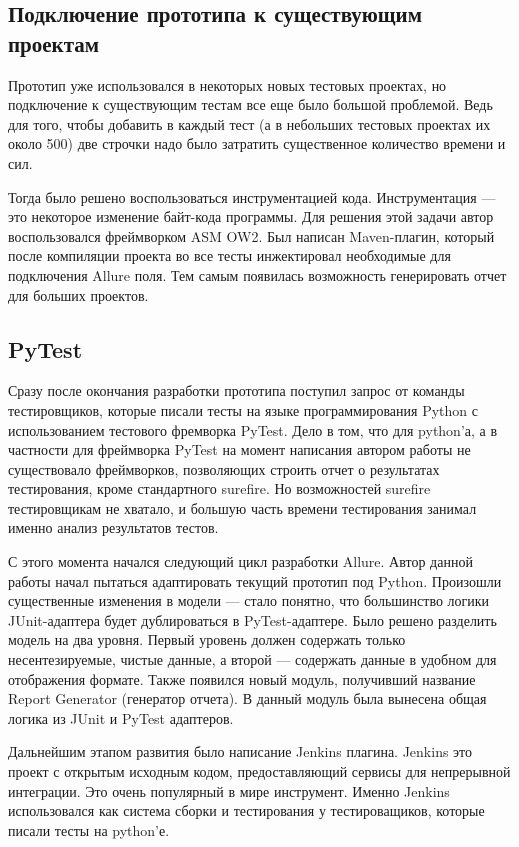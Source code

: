 \subsection{Подключение прототипа к существующим проектам}

Прототип уже использовался в некоторых новых тестовых проектах, но подключение к существующим тестам все еще было большой проблемой. Ведь для того, чтобы добавить в каждый тест (а в небольших тестовых проектах их около 500) две строчки надо было затратить существенное количество времени и сил. 

Тогда было решено воспользоваться инструментацией кода. Инструментация --- это некоторое изменение байт-кода программы. Для решения этой задачи автор воспользовался фреймворком ASM OW2. Был написан Maven-плагин, который после компиляции проекта во все тесты инжектировал необходимые для подключения Allure поля. Тем самым появилась возможность генерировать отчет для больших проектов.

\subsection{PyTest}

Сразу после окончания разработки прототипа поступил запрос от команды тестировщиков, которые писали тесты на языке программирования Python с использованием тестового фремворка PyTest. Дело в том, что для python'а, а в частности для фреймворка PyTest на момент написания автором работы не существовало фреймворков, позволяющих строить отчет о результатах тестирования, кроме стандартного surefire. Но возможностей surefire тестировщикам не хватало, и большую часть времени тестирования занимал именно анализ результатов тестов.

С этого момента начался следующий цикл разработки Allure. Автор данной работы начал пытаться адаптировать текущий прототип под Python. Произошли существенные изменения в модели --- стало понятно, что большинство логики JUnit-адаптера будет дублироваться в PyTest-адаптере.
Было решено разделить модель на два уровня. Первый уровень должен содержать только несентезируемые, чистые данные, а второй --- содержать данные в удобном для отображения формате. Также появился новый модуль, получивший название Report Generator (генератор отчета). В данный модуль была вынесена общая логика из JUnit и PyTest адаптеров.

Дальнейшим этапом развития было написание Jenkins плагина. Jenkins это проект с открытым исходным кодом, предоставляющий сервисы для непрерывной интеграции. Это очень популярный в мире инструмент. Именно Jenkins использовался как система сборки и тестирования у тестироващиков, которые писали тесты на python'е.  

